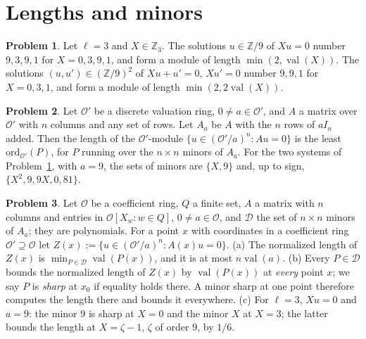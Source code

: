 \documentclass[reqno]{amsart}
\theoremstyle{definition}
\newtheorem{problem}{Problem}[section]
\theoremstyle{plain}
\newcommand{\Z}{\mathbb{Z}}
\newcommand{\val}{\operatorname{val}}
\newcommand{\ord}{\mathrm{ord}}
\newcommand{\Oc}{\mathcal{O}}
\begin{document}
\section{Lengths and minors}\label{sec:minors}

\begin{problem}\label{pr:one-equation}
Let \(\ell = 3\) and \(X \in \Z_3\).  The solutions \(u \in \Z/9\) of \(Xu = 0\) number \(9, 3, 9, 1\) for \(X = 0, 3, 9, 1\), and form a module of length \(\min(2, \val(X))\).  The solutions \((u, u') \in (\Z/9)^2\) of \(Xu + u' = 0\), \(Xu' = 0\) number \(9, 9, 1\) for \(X = 0, 3, 1\), and form a module of length \(\min(2, 2\val(X))\).
\end{problem}

\begin{problem}\label{pr:sharp}
Let \(\Oc'\) be a discrete valuation ring, \(0 \ne a \in \Oc'\), and \(A\) a matrix over \(\Oc'\) with \(n\) columns and any set of rows.  Let \(A_a\) be \(A\) with the \(n\) rows of \(a I_n\) added.  Then the length of the \(\Oc'\)-module \(\{u \in (\Oc'/a)^n : Au = 0\}\) is the least \(\ord_{\Oc'}(P)\), for \(P\) running over the \(n \times n\) minors of \(A_a\).  For the two systems of Problem~\ref{pr:one-equation}, with \(a = 9\), the sets of minors are \(\{X, 9\}\) and, up to sign, \(\{X^2, 9, 9X, 0, 81\}\).
\end{problem}

\begin{problem}\label{pr:sharp-use}
Let \(\Oc\) be a coefficient ring, \(Q\) a finite set, \(A\) a matrix with \(n\) columns and entries in \(\Oc[X_w : w \in Q]\), \(0 \ne a \in \Oc\), and \(\mathcal D\) the set of \(n \times n\) minors of \(A_a\); they are polynomials.  For a point \(x\) with coordinates in a coefficient ring \(\Oc' \supseteq \Oc\) let \(Z(x) := \{u \in (\Oc'/a)^n : A(x)u = 0\}\).
\textup{(a)} The normalized length of \(Z(x)\) is \(\min_{P \in \mathcal D} \val(P(x))\), and it is at most \(n \val(a)\).
\textup{(b)} Every \(P \in \mathcal D\) bounds the normalized length of \(Z(x)\) by \(\val(P(x))\) at \emph{every} point \(x\); we say \(P\) is \emph{sharp} at \(x_0\) if equality holds there.  A minor sharp at one point therefore computes the length there and bounds it everywhere.
\textup{(c)} For \(\ell = 3\), \(Xu = 0\) and \(a = 9\): the minor \(9\) is sharp at \(X = 0\) and the minor \(X\) at \(X = 3\); the latter bounds the length at \(X = \zeta - 1\), \(\zeta\) of order \(9\), by \(1/6\).
\end{problem}
\end{document}
